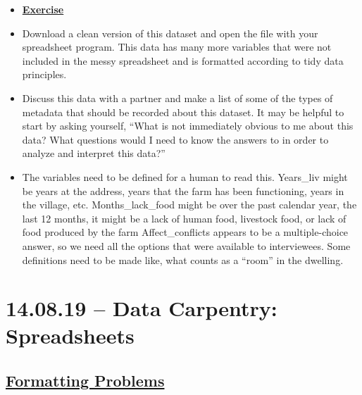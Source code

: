 \documentclass[12pt]{article}
\begin{document}
\color{gray}
\begin{itemize}
\renewcommand{\labelitemi}{}
\item \textbf{\underline{Exercise}}
    \item Download a clean version of this dataset and open the file with your spreadsheet program. This data has many more variables that were not included in the messy spreadsheet and is formatted according to tidy data principles.
    \item Discuss this data with a partner and make a list of some of the types of metadata that should be recorded about this dataset. It may be helpful to start by asking yourself, “What is not immediately obvious to me about this data? What questions would I need to know the answers to in order to analyze and interpret this data?”
\end{itemize}

\color{black}
\begin{itemize}
\renewcommand{\labelitemi}{}
    \item The variables need to be defined for a human to read this. Years\_liv might be years at the address, years that the farm has been functioning, years in the village, etc. Months\_lack\_food might be over the past calendar year, the last 12 months, it might be a lack of human food, livestock food, or lack of food produced by the farm
    \vspace{0.5em}
    \newline Affect\_conflicts appears to be a multiple-choice answer, so we need all the options that were available to interviewees.
    \vspace{0.5em}
    \newline Some definitions need to be made like, what counts as a “room” in the dwelling.
\end{itemize}

\newpage\section{14.08.19 – Data Carpentry: Spreadsheets}

\subsection{\textbf{\href{https://datacarpentry.org/spreadsheets-socialsci/02-common-mistakes/index.html}{\textbf{Formatting Problems}}}}
\end{document}
